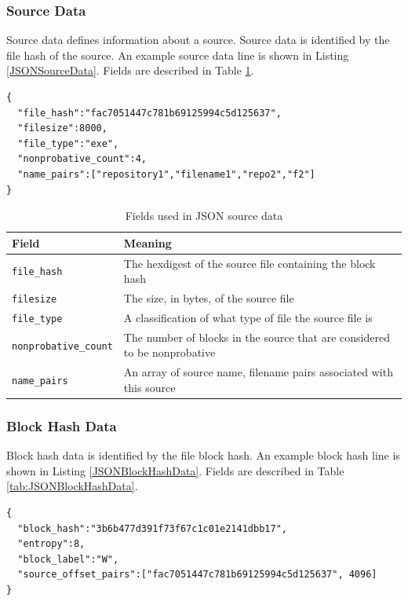 \documentclass[11pt,fleqn]{article} %
\begin{document}
\subsubsection{Source Data}
Source data defines information about a source. Source data is identified by the file hash of the source.  An example source data line is shown in Listing \ref{JSONSourceData}. Fields are described in Table \ref{tab:JSONSourceData}.\\

\lstset{style=customfile}
\begin{lstlisting}[caption={Example JSON source data used during import/export}, label=JSONSourceData]
{
  "file_hash":"fac7051447c781b69125994c5d125637",
  "filesize":8000,
  "file_type":"exe",
  "nonprobative_count":4,
  "name_pairs":["repository1","filename1","repo2","f2"]
}
\end{lstlisting}

\begin{table}[!ht]

\centering
\caption{Fields used in JSON source data}
\label{tab:JSONSourceData}
\begin{tabular}{|p{5 cm}|p{8.8 cm}|}
\hline \hline
\textbf{Field} & \textbf{Meaning} \\
\hline
\verb+file_hash+ & The hexdigest of the source file containing the block hash\\
\hline
\verb+filesize+ & The size, in bytes, of the source file\\
\hline
\verb+file_type+ & A classification of what type of file the source file is\\
\hline
\verb+nonprobative_count+ & The number of blocks in the source that are considered to be nonprobative\\
\hline
\verb+name_pairs+ & An array of source name, filename pairs associated with this source\\
\hline
\end{tabular}
\end{table}

\subsubsection{Block Hash Data}
Block hash data is identified by the file block hash.  An example block hash line is shown in Listing \ref{JSONBlockHashData}. Fields are described in Table \ref{tab:JSONBlockHashData}.\\

\lstset{style=customfile}
\begin{lstlisting}[caption={Example JSON block hash data used during import/export}, label=JSONBlockHashData]
{
  "block_hash":"3b6b477d391f73f67c1c01e2141dbb17",
  "entropy":8,
  "block_label":"W",
  "source_offset_pairs":["fac7051447c781b69125994c5d125637", 4096]
}
\end{lstlisting}
\end{document}
